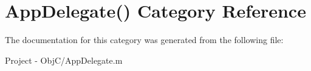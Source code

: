 \hypertarget{category_app_delegate_07_08}{}\section{App\+Delegate() Category Reference}
\label{category_app_delegate_07_08}


The documentation for this category was generated from the following file\+:\begin{DoxyCompactItemize}
\item 
Project -\/ Obj\+C/App\+Delegate.\+m\end{DoxyCompactItemize}
